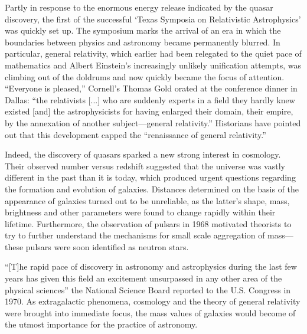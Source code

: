 \documentclass{naturefig}
\begin{document}
Partly in response to the enormous energy release indicated by the quasar discovery, the first of the successful `Texas Symposia on Relativistic Astrophysics' was quickly set up. The symposium marks the arrival of an era in which the boundaries between physics and astronomy became permanently blurred. In particular, general relativity, which earlier had been relegated to the quiet pace of mathematics and Albert Einstein's increasingly unlikely unification attempts,\cite{Eisenstaedt2006,Dongen2010} was climbing out of the doldrums and now quickly became the focus of attention. ``Everyone is pleased,'' Cornell's Thomas Gold orated at the conference dinner in Dallas: ``the relativists [...] who are suddenly experts in a field they hardly knew existed [and] the astrophysicists for having enlarged their domain, their empire, by the annexation of another subject---general relativity.''\cite{Gold1965} Historians have pointed out that this development capped the ``renaissance of general relativity.''\cite{Blum2015}


Indeed, the discovery of quasars sparked a new strong interest in cosmology. Their observed number versus redshift suggested that the universe was vastly different in the past than it is today,\cite{Sciama1971a} which produced urgent questions regarding the formation and evolution of galaxies.\cite{Page1964} Distances determined on the basis of the appearance of galaxies turned out to be unreliable, as the latter's shape, mass, brightness and other parameters were found to change rapidly within their lifetime.\cite{Tinsley1968a} Furthermore, the observation of pulsars in 1968 motivated theorists to try to further understand the mechanisms for small scale aggregation of mass\cite{Hewish1968}---these pulsars were soon identified as neutron stars.

``[T]he rapid pace of discovery in astronomy and astrophysics during the last few years has given this field an excitement unsurpassed in any other area of the physical sciences'' the National Science Board reported to the U.S. Congress in 1970.\cite{NationalResearchCouncil1972} %
As extragalactic phenomena, cosmology and the theory of general relativity were brought into immediate focus, the mass values of galaxies would become of the utmost importance for the practice of astronomy.

\vspace{8pt}

\end{document}
